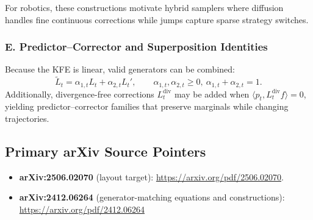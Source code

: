 \documentclass[
]{article}
\theoremstyle{remark}
\begin{document}
For robotics, these constructions motivate hybrid samplers where diffusion handles fine continuous corrections while jumps capture sparse strategy switches.

\subsubsection{E. Predictor--Corrector and Superposition Identities}

Because the KFE is linear, valid generators can be combined:
\[
\widetilde L_t=\alpha_{1,t}L_t+\alpha_{2,t}L_t',\qquad
\alpha_{1,t},\alpha_{2,t}\ge 0,\ \alpha_{1,t}+\alpha_{2,t}=1.
\]
Additionally, divergence-free corrections \(L_t^{\mathrm{div}}\) may be added when
\(\langle p_t,L_t^{\mathrm{div}}f\rangle=0\), yielding predictor--corrector families that preserve marginals while changing trajectories. \cite{gm2025}

\subsection{Primary arXiv Source Pointers}

\begin{itemize}
  \item \textbf{arXiv:2506.02070} (layout target): \url{https://arxiv.org/pdf/2506.02070}. \cite{arxiv2506-layout}
  \item \textbf{arXiv:2412.06264} (generator-matching equations and constructions): \url{https://arxiv.org/pdf/2412.06264}
\end{itemize}
\end{document}
